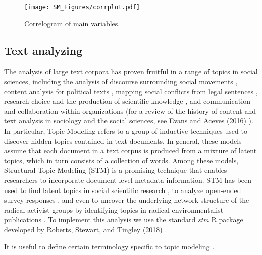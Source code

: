 \documentclass[onecolumn]{article}
\begin{document}
\pagebreak
\clearpage


\begin{figure}[!h]
\centering
\texttt{[image: SM\_Figures/corrplot.pdf]}
\caption{Correlogram of main variables.}
\label{fig:correlations}
\end{figure}



\pagebreak
\clearpage

\subsection{Text analyzing}\label{SMet3}

The analysis of large text corpora has proven fruitful in a range of topics in social sciences, including the analysis of discourse surrounding social movements \cite{bail2012}, content analysis for political texts \cite{grimmer2010,grimmer2013}, mapping social conflicts from legal sentences \cite{herrera2019understanding}, research choice and the production of scientific knowledge \cite{foster2015}, and communication and collaboration within organizations\cite{goldberg2016} (for a review of the history of content and text analysis in sociology and the social sciences, see Evans and Aceves (2016) \cite{evans2016}). In particular, Topic Modeling refers to a group of inductive techniques used to discover hidden topics contained in text documents. In general, these models assume that each document in a text corpus is produced from a mixture of latent topics, which in turn consists of a collection of words. Among these models, Structural Topic Modeling (STM) is a promising technique that enables researchers to incorporate document-level metadata information. STM has been used to find latent topics in social scientific research \cite{lindstedt2019, bohr2018}, to analyze open-ended survey responses \cite{roberts2014}, and even to uncover the underlying network structure of the radical activist groups by identifying topics in radical environmentalist publications \cite{almquist2019}. To implement this analysis we use the standard \textit{stm} R package developed by Roberts, Stewart, and Tingley (2018) \cite{stm}.


It is useful to define certain terminology specific to topic modeling \cite{Blei2012}.
      
\end{document}
